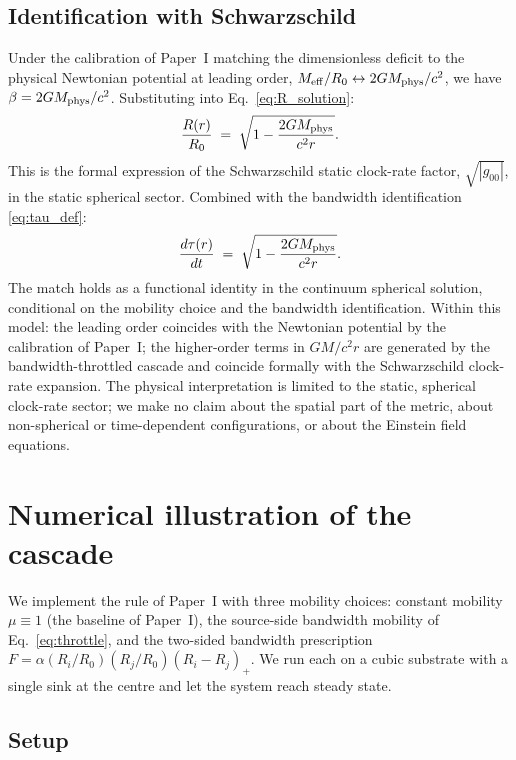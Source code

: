 \documentclass[11pt,a4paper]{article}
\begin{document}
\subsection{Identification with Schwarzschild}

Under the calibration of Paper~I matching the dimensionless
deficit to the physical Newtonian potential at leading order,
$M_{\rm eff} / R_0 \leftrightarrow 2GM_{\rm phys}/c^2$, we
have $\beta = 2 GM_{\rm phys} / c^2$. Substituting into
Eq.~\eqref{eq:R_solution}:
\begin{equation}
\frac{R(r)}{R_0}
\;=\; \sqrt{1 - \frac{2 G M_{\rm phys}}{c^2 r}}.
\label{eq:schwarzschild}
\end{equation}
This is the formal expression of the Schwarzschild static
clock-rate factor, $\sqrt{|g_{00}|}$, in the static spherical
sector. Combined with the bandwidth identification
\eqref{eq:tau_def}:
\begin{equation}
\frac{d\tau(r)}{dt}
\;=\; \sqrt{1 - \frac{2 G M_{\rm phys}}{c^2 r}}.
\label{eq:dtau_schw}
\end{equation}
The match holds as a functional identity in the continuum
spherical solution, conditional on the mobility choice and the
bandwidth identification. Within this model: the leading order
coincides with the Newtonian potential by the calibration of
Paper~I; the higher-order terms in $GM/c^2 r$ are generated by
the bandwidth-throttled cascade and coincide formally with the
Schwarzschild clock-rate expansion. The physical
interpretation is limited to the static, spherical clock-rate
sector; we make no claim about the spatial part of the metric,
about non-spherical or time-dependent configurations, or about
the Einstein field equations.

\section{Numerical illustration of the cascade}
\label{sec:numerical}

We implement the rule of Paper~I with three mobility choices:
constant mobility $\mu \equiv 1$ (the baseline of Paper~I),
the source-side bandwidth mobility of
Eq.~\eqref{eq:throttle}, and the two-sided bandwidth
prescription $F = \alpha (R_i/R_0)(R_j/R_0)(R_i - R_j)_+$. We
run each on a cubic substrate with a single sink at the centre
and let the system reach steady state.

\subsection{Setup}
\end{document}
